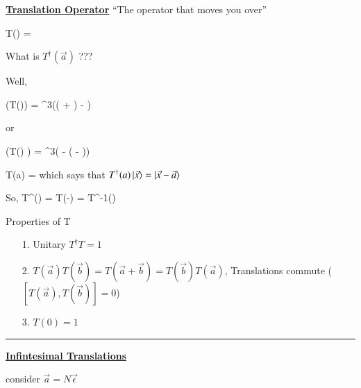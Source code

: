 {\textbf{\underline{Translation Operator}}
``The operator that moves you over''

\be
T() \ketX = 
\ee


What is $T^\dagger(\vec{a})$ ???

Well, 

\be
{}\left(T()\ketX \right) = \delta^3(( + ) - )
\ee

or 

\be
\left(T() \right) \ketX  = \delta^3( - ( - ))
\ee

\be
\Rightarrow {}T(a) = 
\ee
which says that $T^\dagger(a)\ket{\vec{x}} = \ket{\vec{x}-\vec{a}}$

So, 
\be
T^\dagger() = T(-) = T^{-1}()
\ee

Properties of T
\begin{itemize}
\item[1.] Unitary $T^\dagger T = 1$
\item[2.] $T(\vec{a})T(\vec{b}) = T(\vec{a} + \vec{b}) = T(\vec{b})T(\vec{a})$,  Translations commute ($[T(\vec{a}),T(\vec{b})] = 0$)
\item[3.] $T(0) = 1$
\end{itemize}


\noindent\rule{\textwidth}{1pt}

\textbf{\underline{Infintesimal Translations}}

consider $\vec{a} = N\vec{\epsilon}$



}



